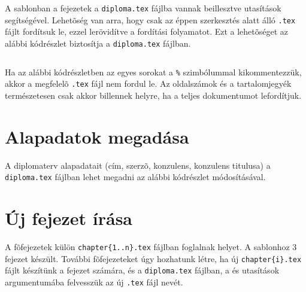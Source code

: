 A sablonban a fejezetek a \verb+diploma.tex+ fájlba vannak beillesztve \verb++ utasítások segítségével. Lehetõség van arra, hogy csak az éppen szerkesztés alatt álló \verb+.tex+ fájlt fordítsuk le, ezzel lerövidítve a fordítási folyamatot. Ezt a lehetõséget az alábbi kódrészlet biztosítja a \verb+diploma.tex+ fájlban.
\begin{lstlisting}[frame=single,float=!ht]

\end{lstlisting}

Ha az alábbi kódrészletben az egyes sorokat a \verb+%+ szimbólummal kikommentezzük, akkor a megfelelõ \verb+.tex+ fájl nem fordul le. Az oldalszámok és a tartalomjegyék természetesen csak akkor billennek helyre, ha a teljes dokumentumot lefordítjuk.

\newpage
\section{Alapadatok megadása}
A diplomaterv alapadatait (cím, szerzõ, konzulens, konzulens titulusa) a \verb+diploma.tex+ fájlban lehet megadni az alábbi kódrészlet módosításával.


\section{Új fejezet írása}
A fõfejezetek külön \verb+chapter{1..n}.tex+ fájlban foglalnak helyet. A sablonhoz 3 fejezet készült. További fõfejezeteket úgy hozhatunk létre, ha új \verb+chapter{i}.tex+ fájlt készítünk a fejezet számára, és a \verb+diploma.tex+ fájlban, a \verb++ és \verb++ utasítások argumentumába felvesszük az új \verb+.tex+ fájl nevét.





